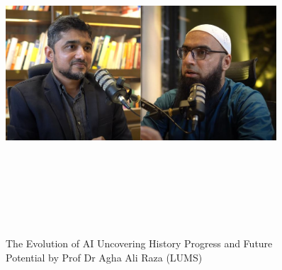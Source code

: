 \documentclass[a4paper,12pt]{article}
\begin{document}
\newpage
\vspace*{1cm} %
\begin{figure}[h]
	\centering
	\vspace{-10pt} %
	\includegraphics[width=0.9\textwidth, height=12cm, keepaspectratio]{../Talks Blogs/The Evolution of AI Uncovering History Progress and Future Potential ft Prof Dr Agha Ali Raza}
	\vspace{-5pt} %
	\caption{The Evolution of AI Uncovering History Progress and Future Potential by \newline Prof Dr Agha Ali Raza (LUMS)}
	\vspace{-10pt}
\end{figure}
\end{document}
